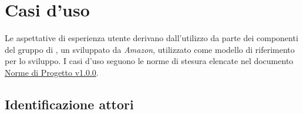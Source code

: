 \documentclass{scalatekids-article}
\begin{document}
\section{Casi d'uso}

Le aspettative di esperienza utente derivano dall'utilizzo da parte dei
componenti del gruppo di , un 
 sviluppato da \textit{Amazon}, utilizzato come modello di
riferimento per lo sviluppo. I casi d'uso seguono le norme di stesura elencate
nel documento \href{run:../Interni/NormeDiProgetto\_v1.0.0.pdf}{Norme di
  Progetto v1.0.0}.

\subsection{Identificazione attori}
\end{document}

